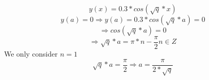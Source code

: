 \begin{equation}
  y(x)=0.3*cos(\sqrt{q}*x)
\end{equation}
\begin{equation}
  y(a) = 0 \Rightarrow y(a)=0.3*cos(\sqrt{q}*a) = 0
\end{equation}
\begin{equation}
  \Rightarrow cos(\sqrt{q}*a) = 0
\end{equation}
\begin{equation}
  \Rightarrow \sqrt{q}*a = \pi * n - \frac{\pi}{2}      n \in Z
\end{equation}
We only consider $n=1$
\begin{equation}
  \sqrt{q}*a=\frac{\pi}{2} \Rightarrow a=\frac{\pi}{2*\sqrt{q}}
\end{equation}
